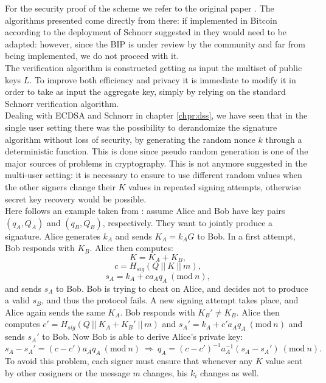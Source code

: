 \bigskip
\noindent
For the security proof of the scheme we refer to the original paper \cite{RefWork:11}. The algorithms presented come directly from there: if implemented in Bitcoin according to the deployment of Schnorr suggested in \cite{RefWork:5} they would need to be adapted: however, since the BIP is under review by the community and far from being implemented, we do not proceed with it. 
\\
The verification algorithm is constructed getting as input the multiset of public keys $L$. To improve both efficiency and privacy it is immediate to modify it in order to take as input the aggregate key, simply by relying on the standard Schnorr verification algorithm.
\\
Dealing with ECDSA and Schnorr in chapter \ref{chpr:dss}, we have seen that in the single user setting there was the possibility to derandomize the signature algorithm without loss of security, by generating the random nonce $k$ through a deterministic function. This is done since pseudo random generation is one of the major sources of problems in cryptography. This is not anymore suggested in the multi-user setting: it is necessary to ensure to use different random values when the other signers change their $K$ values in repeated signing attempts, otherwise secret key recovery would be possible. 
\\
Here follows an example taken from \cite{RefWork:11}: assume Alice and Bob have key pairs $(q_A, Q_A)$ and $(q_B, Q_B)$, respectively. They want to jointly produce a signature. Alice generates $k_A$ and sends $K_A = k_AG$ to Bob. In a first attempt, Bob responds with $K_B$. Alice then computes:
$$K = K_A + K_B,$$
$$c = H_{sig}(Q \ || \ K \ || \ m),$$
$$s_A = k_A + ca_Aq_A \ (\text{mod} \ n),$$
and sends $s_A$ to Bob. Bob is trying to cheat on Alice, and decides not to produce a valid $s_B$, and thus the protocol fails. A new signing attempt takes place, and Alice again sends the same $K_A$. Bob responds with $K_B' \neq K_B$. Alice then computes $c' = H_{sig}(Q \ || \ K_A + K_B' \ || \ m)$ and $s_A' = k_A + c'a_Aq_A \ (\text{mod} \ n)$ and sends $s_A'$ to Bob. Now Bob is able to derive Alice's private key:
$$s_A - s_A' = (c - c')a_Aq_A \ (\text{mod} \ n) \ \Longrightarrow \ q_A = (c - c')^{-1}a_A^{-1}(s_A - s_A') \ (\text{mod} \ n).$$
To avoid this problem, each signer must ensure that whenever any $K$ value sent by other cosigners or the message $m$ changes, his $k_i$ changes as well. 

\bigskip

\bigskip

